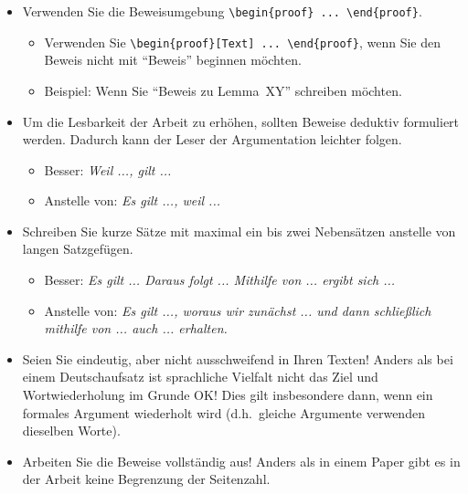 \begin{itemize}

  \item Verwenden Sie die Beweisumgebung \verb$\begin{proof} ... \end{proof}$.
        \begin{itemize}
          \item Verwenden Sie \verb$\begin{proof}[Text] ... \end{proof}$, 
          wenn Sie den Beweis nicht mit "`Beweis"' beginnen möchten.
          \item Beispiel: Wenn Sie "`Beweis zu Lemma~XY"' schreiben möchten.
        \end{itemize}

  \item Um die Lesbarkeit der Arbeit zu erhöhen, sollten Beweise deduktiv formuliert werden. Dadurch kann der Leser der Argumentation leichter folgen.
        \begin{itemize}
          \item Besser: \emph{Weil ..., gilt ...}
          \item Anstelle von: \emph{Es gilt ..., weil ...}
        \end{itemize}

  \item Schreiben Sie kurze Sätze mit maximal ein bis zwei Nebensätzen anstelle von langen Satzgefügen.
        \begin{itemize}
          \item Besser: \emph{Es gilt ... Daraus folgt ... Mithilfe von ... ergibt sich ...}
          \item Anstelle von: \emph{Es gilt ..., woraus wir zunächst ... und dann schließlich mithilfe von ... auch ... erhalten.}
        \end{itemize}

  \item Seien Sie eindeutig, aber nicht ausschweifend in Ihren Texten! Anders als bei einem Deutschaufsatz ist sprachliche Vielfalt nicht das Ziel und Wortwiederholung im Grunde OK! Dies gilt insbesondere dann, wenn ein formales Argument wiederholt wird (d.h.\ gleiche Argumente verwenden dieselben Worte).

  \item Arbeiten Sie die Beweise vollständig aus! Anders als in einem Paper gibt es in der Arbeit keine Begrenzung der Seitenzahl.


\end{itemize}
